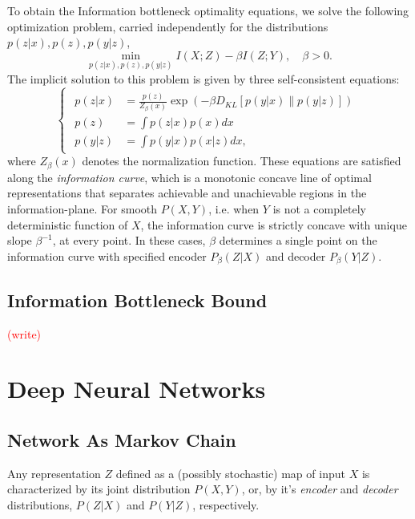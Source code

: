 \documentclass[11pt]{article}
\newcommand\myworries[1]{\textcolor{red}{(#1)}}
\begin{document}
To obtain the Information bottleneck optimality equations, we solve the following optimization problem, carried independently for the distributions $p(z\vert x), p(z), p(y\vert z)$,
\begin{equation}
\underset{p(z\vert x), p(z), p(y\vert z)}{\min} I(X;Z) - \beta I(Z;Y), \quad\beta>0.
\end{equation}
The implicit solution to this problem is given by three self-consistent equations:
\begin{equation}
\begin{cases}
\begin{array}{rl}
p(z\vert x) & =\frac{p(z)}{Z_{\beta}(x)}\exp\left(-\beta D_{KL}\left[p(y\vert x)\rVert p(y\vert z)\right]\right)\\
p(z) & =\int p(z\vert x)p(x)dx\\
p(y\vert z) & =\int p(y\vert x)p(x\vert z)dx,
\end{array}
\end{cases}
\end{equation}
where $Z_\beta(x)$ denotes the normalization function. These equations are satisfied along the \emph{information curve}, which is a monotonic concave line of optimal representations that separates achievable and unachievable regions in the information-plane. For smooth $P(X,Y)$, i.e. when $Y$ is not a completely deterministic function of $X$, the information curve is strictly concave with unique slope $\beta^{-1}$, at every point.  In these cases, $\beta$ determines a single point on the information curve with specified encoder $P_\beta(Z\vert X)$ and decoder $P_\beta(Y\vert Z)$.

\subsection*{Information Bottleneck Bound}

\myworries{write}

\section{Deep Neural Networks}

\subsection*{Network As Markov Chain}

Any representation $Z$ defined as a (possibly stochastic) map of input $X$ is characterized by its joint distribution $P(X,Y)$, or, by it's \emph{encoder} and \emph{decoder} distributions, $P(Z \vert X)$ and $P(Y \vert Z)$, respectively.
\end{document}
